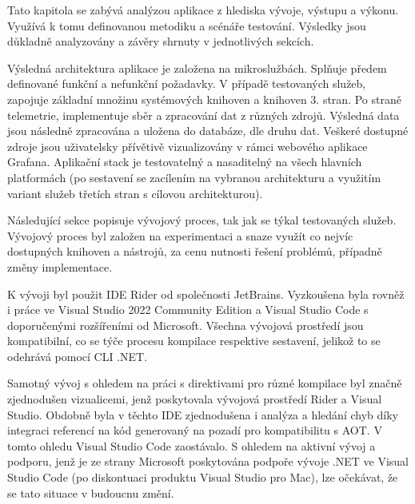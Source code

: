 
Tato kapitola se zabývá analýzou aplikace z hlediska vývoje, výstupu a výkonu. Využívá k tomu definovanou metodiku a scénáře testování. Výsledky jsou důkladně analyzovány a závěry shrnuty v jednotlivých sekcích.


Výsledná architektura aplikace je založena na mikroslužbách. Splňuje předem definované funkční a nefunkční požadavky. V případě testovaných služeb, zapojuje základní množinu systémových knihoven a knihoven 3. stran. Po straně telemetrie, implementuje sběr a zpracování dat z různých zdrojů. Výsledná data jsou následně zpracována a uložena do databáze, dle druhu dat. Veškeré dostupné zdroje jsou uživatelsky přívětivě vizualizovány v rámci webového aplikace Grafana. Aplikační stack je testovatelný a nasaditelný na všech hlavních platformách (po sestavení se zacílením na vybranou architekturu a využitím variant služeb třetích stran s cílovou architekturou).



Následující sekce popisuje vývojový proces, tak jak se týkal testovaných služeb. Vývojový proces byl založen na experimentaci a snaze využít co nejvíc dostupných knihoven a nástrojů, za cenu nutnosti řešení problémů, případně změny implementace.



K vývoji byl použit IDE Rider od společnosti JetBrains. Vyzkoušena byla rovněž i práce ve Visual Studio 2022 Community Edition a Visual Studio Code s doporučenými rozšířeními od Microsoft. Všechna vývojová prostředí jsou kompatibilní, co se týče procesu kompilace respektive sestavení, jelikož to se odehrává pomocí CLI .NET.

Samotný vývoj s ohledem na práci s direktivami pro různé kompilace byl značně zjednodušen vizualicemi, jenž poskytovala vývojová prostředí Rider a Visual Studio. Obdobně byla v těchto IDE zjednodušena i analýza a hledání chyb díky integraci referencí na kód generovaný na pozadí pro kompatibilitu s AOT. V tomto ohledu Visual Studio Code zaostávalo. S ohledem na aktivní vývoj a podporu, jenž je ze strany Microsoft poskytována podpoře vývoje .NET ve Visual Studio Code (po diskontuaci produktu Visual Studio pro Mac), lze očekávat, že se tato situace v budoucnu změní.

